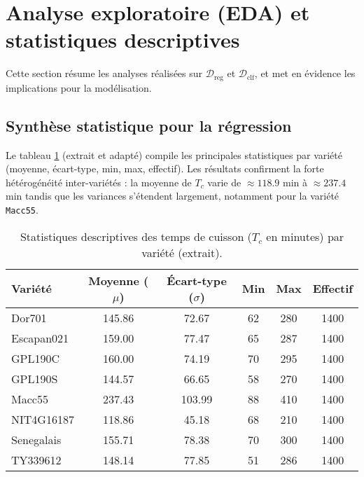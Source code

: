 \section{Analyse exploratoire (EDA) et statistiques descriptives}

Cette section résume les analyses réalisées sur \(\mathcal{D}_{\text{reg}}\) et \(\mathcal{D}_{\text{clf}}\), et met en évidence les implications pour la modélisation.

\subsection{Synthèse statistique pour la régression}

Le tableau \ref{tab:stats_descriptives} (extrait et adapté) compile les principales statistiques par variété (moyenne, écart-type, min, max, effectif). Les résultats confirment la forte hétérogénéité inter-variétés : la moyenne de \(T_c\) varie de \(\approx 118.9\) min à \(\approx 237.4\) min tandis que les variances s'étendent largement, notamment pour la variété \texttt{Macc55}.

\begin{table}[H]
	\centering
	\caption{Statistiques descriptives des temps de cuisson ($T_c$ en minutes) par variété (extrait).}
	\label{tab:stats_descriptives}
	\begin{tabular}{lccccc}
		\toprule
		\textbf{Variété} & \textbf{Moyenne ($\mu$)} & \textbf{Écart-type ($\sigma$)} & \textbf{Min} & \textbf{Max} & \textbf{Effectif} \\ \midrule
		Dor701           & 145.86                   & 72.67                          & 62           & 280          & 1400              \\
		Escapan021       & 159.00                   & 77.47                          & 65           & 287          & 1400              \\
		GPL190C          & 160.00                   & 74.19                          & 70           & 295          & 1400              \\
		GPL190S          & 144.57                   & 66.65                          & 58           & 270          & 1400              \\
		Macc55           & 237.43                   & 103.99                         & 88           & 410          & 1400              \\
		NIT4G16187       & 118.86                   & 45.18                          & 68           & 210          & 1400              \\
		Senegalais       & 155.71                   & 78.38                          & 70           & 300          & 1400              \\
		TY339612         & 148.14                   & 77.85                          & 51           & 286          & 1400              \\ \bottomrule
	\end{tabular}
\end{table}

